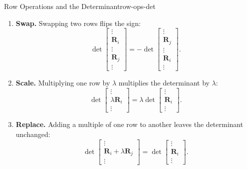 \begin{theorem}{Row Operations and the Determinant}{row-ops-det}
  \begin{enumerate}
    \item \textbf{Swap.} Swapping two rows flips the sign:
          \[
            \det
            \begin{bmatrix}
              \vdots \\ \mathbf{R}_i \\ \vdots \\ \mathbf{R}_j \\ \vdots
            \end{bmatrix}
            = -\det
            \begin{bmatrix}
              \vdots \\ \mathbf{R}_j \\ \vdots \\ \mathbf{R}_i \\ \vdots
            \end{bmatrix}
            .
          \]
    \item \textbf{Scale.} Multiplying one row by $\lambda$ multiplies the determinant by $\lambda$:
          \[
            \det
            \begin{bmatrix}
              \vdots \\ \lambda \mathbf{R}_i \\ \vdots
            \end{bmatrix}
            = \lambda \det
            \begin{bmatrix}
              \vdots \\ \mathbf{R}_i \\ \vdots
            \end{bmatrix}
            .
          \]
    \item \textbf{Replace.} Adding a multiple of one row to another leaves the determinant unchanged:
          \[
            \det
            \begin{bmatrix}
              \vdots \\ \mathbf{R}_i + \lambda \mathbf{R}_j \\ \vdots
            \end{bmatrix}
            = \det
            \begin{bmatrix}
              \vdots \\ \mathbf{R}_i \\ \vdots
            \end{bmatrix}
            .
          \]
  \end{enumerate}
\end{theorem}

